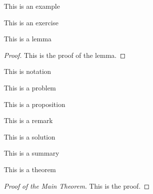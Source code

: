 \begin{example}
This is an example
\end{example}

\begin{exercise}
This is an exercise
\end{exercise}

\begin{lemma}
This is a lemma
\end{lemma}

\begin{proof}
This is the proof of the lemma.
\end{proof}

\begin{notation}
This is notation
\end{notation}

\begin{problem}
This is a problem
\end{problem}

\begin{proposition}
This is a proposition
\end{proposition}

\begin{remark}
This is a remark
\end{remark}

\begin{solution}
This is a solution
\end{solution}

\begin{summary}
This is a summary
\end{summary}

\begin{theorem}
This is a theorem
\end{theorem}

\begin{proof}
[Proof of the Main Theorem]This is the proof.
\end{proof}

